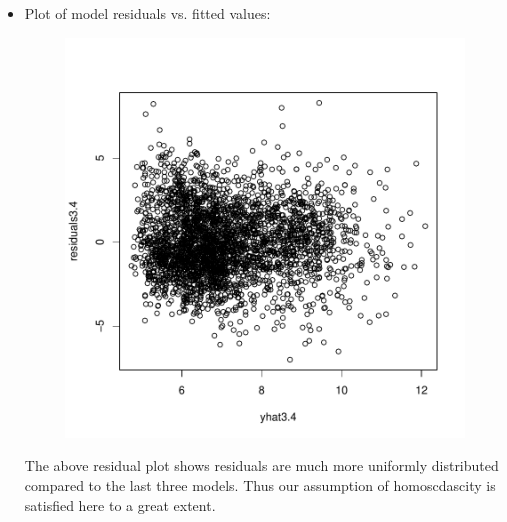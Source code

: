 \documentclass[12pt]{article}
\begin{document}
\begin{itemize}
\item Plot of model residuals vs. fitted values:
\begin{figure}[H]
\begin{Schunk}
\end{Schunk}
\includegraphics{HW3-052}
\end{figure}
The above residual plot shows residuals are much more uniformly distributed compared to the last three models. Thus our assumption of homoscdascity is satisfied here to a great extent.
\clearpage


\end{itemize}
\end{document}

